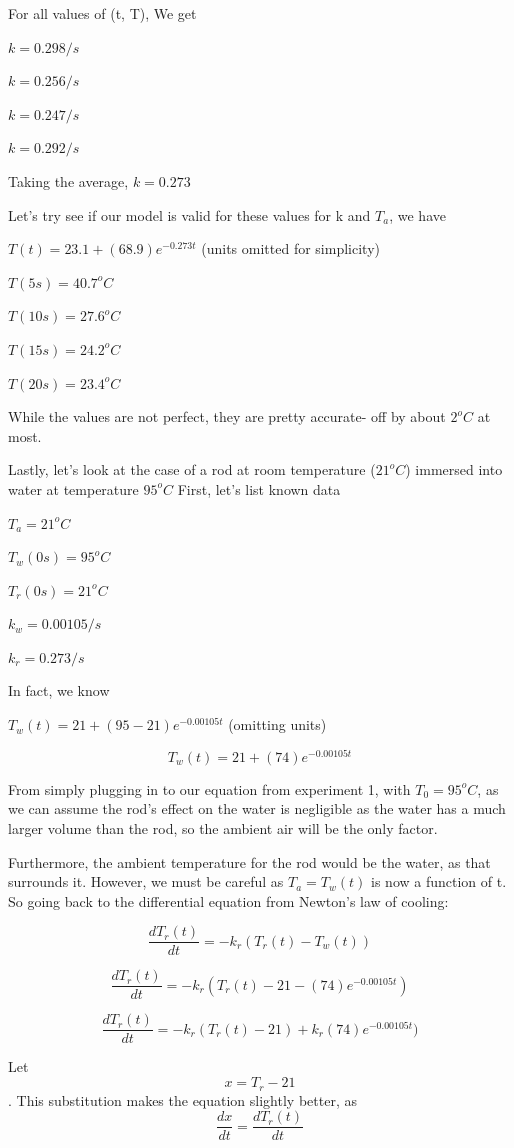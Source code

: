 \documentclass{article}
\begin{document}
For all values of (t, T), We get 

$k = 0.298/s$

$k = 0.256/s$

$k = 0.247/s$

$k = 0.292/s$

Taking the average, $k = 0.273$

Let's try see if our model is valid for these values for k and $T_a$, we have

$T(t) = 23.1 + (68.9)e^{-0.273t}$ (units omitted for simplicity)

$T(5s) = 40.7^oC$

$T(10s) = 27.6^oC$

$T(15s) = 24.2^oC$

$T(20s) = 23.4^oC$

While the values are not perfect, they are pretty accurate- off by about $2^oC$ at most.

\vspace{2cm}

Lastly, let's look at the case of a rod at room temperature ($21^oC$) immersed into water at temperature $95^oC$
First, let's list known data

$T_a = 21^oC$

$T_w(0s) = 95^oC$

$T_r(0s) = 21^oC$ 

$k_w = 0.00105/s$

$k_r = 0.273/s$

In fact, we know 

$T_w(t) = 21+(95-21)e^{-0.00105t}$ (omitting units) 

$$T_w(t) = 21+(74)e^{-0.00105t}$$

From simply plugging in to our equation from experiment 1, with $T_0 = 95^oC$, as we can assume the rod's effect on the water is negligible as the water has a much larger volume than the rod, so the ambient air will be the only factor.

Furthermore, the ambient temperature for the rod would be the water, as that surrounds it. However, we must be careful as $T_a = T_w(t)$ is now a function of t. So going back to the differential equation from Newton's law of cooling:

$$\frac{dT_r(t)}{dt} = -k_r(T_r(t)-T_w(t))$$

$$\frac{dT_r(t)}{dt} = -k_r(T_r(t)-21-(74)e^{-0.00105t})$$

$$\frac{dT_r(t)}{dt} = -k_r(T_r(t)-21)+k_r(74)e^{-0.00105t})$$

Let $$x = T_r - 21$$. This substitution makes the equation slightly better, as $$\frac{dx}{dt} = \frac{dT_r(t)}{dt}$$
\end{document}
